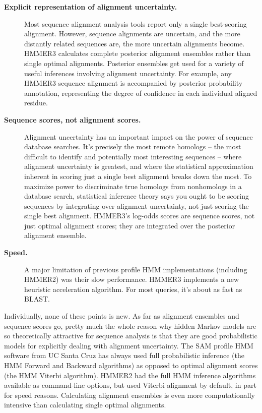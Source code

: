 \begin{description}
\item[\textbf{Explicit representation of alignment uncertainty.}]
  Most sequence alignment analysis tools report only a single
  best-scoring alignment. However, sequence alignments are uncertain,
  and the more distantly related sequences are, the more uncertain
  alignments become. HMMER3 calculates complete posterior alignment
  ensembles rather than single optimal alignments. Posterior ensembles
  get used for a variety of useful inferences involving alignment
  uncertainty. For example, any HMMER3 sequence alignment is
  accompanied by posterior probability annotation, representing the
  degree of confidence in each individual aligned residue.

\item[\textbf{Sequence scores, not alignment scores.}]  Alignment
  uncertainty has an important impact on the power of sequence
  database searches.  It's precisely the most remote homologs -- the
  most difficult to identify and potentially most interesting
  sequences -- where alignment uncertainty is greatest, and where the
  statistical approximation inherent in scoring just a single best
  alignment breaks down the most. To maximize power to discriminate
  true homologs from nonhomologs in a database search, statistical
  inference theory says you ought to be scoring sequences by
  integrating over alignment uncertainty, not just scoring the single
  best alignment. HMMER3's log-odds scores are sequence scores, not
  just optimal alignment scores; they are integrated over the
  posterior alignment ensemble.
  
\item[\textbf{Speed.}] A major limitation of previous profile HMM
  implementations (including HMMER2) was their slow
  performance. HMMER3 implements a new heuristic acceleration
  algorithm. For most queries, it's about as fast as BLAST.
\end{description}

Individually, none of these points is new. As far as alignment
ensembles and sequence scores go, pretty much the whole reason why
hidden Markov models are so theoretically attractive for sequence
analysis is that they are good probabilistic models for explicitly
dealing with alignment uncertainty. The SAM profile HMM software from
UC Santa Cruz has always used full probabilistic inference (the HMM
Forward and Backward algorithms) as opposed to optimal alignment
scores (the HMM Viterbi algorithm). HMMER2 had the full HMM inference
algorithms available as command-line options, but used Viterbi
alignment by default, in part for speed reasons. Calculating alignment
ensembles is even more computationally intensive than calculating
single optimal alignments.

